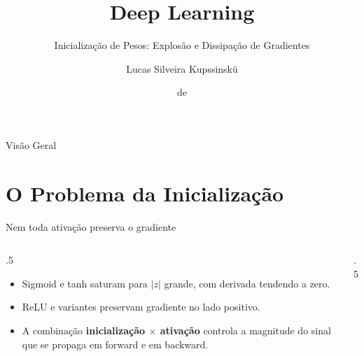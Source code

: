 \documentclass[aspectratio=169,xcolor=dvipsnames]{beamer}
\title{Deep Learning}
\subtitle{Inicialização de Pesos: Explosão e Dissipação de Gradientes}
\author{Lucas Silveira Kupssinskü}
\institute
{
    Machine Learning Theory and Applications Laboratory \\
    PUCRS
}
\date{\mespor de \the\year}
\begin{document}
  \begin{frame}
    \titlepage
  \end{frame}

  \begin{frame}{Visão Geral}
    \tableofcontents
  \end{frame}

  \section{O Problema da Inicialização}

  \begin{frame}{Nem toda ativação preserva o gradiente}
    \begin{columns}
      \begin{column}{.5\linewidth}
        \begin{itemize}
          \item Sigmoid e tanh \alert{saturam} para $|z|$ grande, com derivada
            tendendo a zero.
          \item ReLU e variantes preservam gradiente no lado positivo.
          \item A combinação \textbf{inicialização $\times$ ativação} controla a
            magnitude do sinal que se propaga em forward e em backward.
        \end{itemize}
      \end{column}
      \begin{column}{.5\linewidth}
        \centering
      \end{column}
    \end{columns}
  \end{frame}
\end{document}
